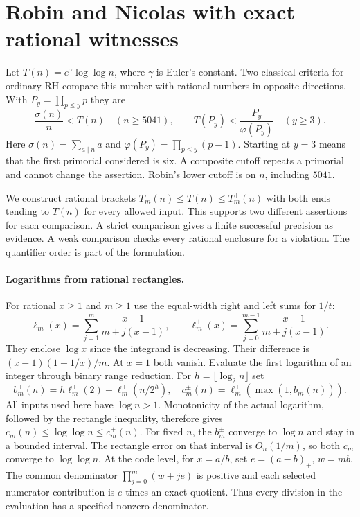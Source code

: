 \section{Robin and Nicolas with exact rational witnesses}\label{sec:named}
Let $T(n)=e^\gamma\log\log n$, where $\gamma$ is Euler's constant. Two classical criteria for ordinary RH compare this number with rational numbers in opposite directions. With $P_y=\prod_{p\le y}p$ they are
\[
 \frac{\sigma(n)}n<T(n)\quad(n\ge5041),\qquad
 T(P_y)<\frac{P_y}{\varphi(P_y)}\quad(y\ge3).
\]
Here $\sigma(n)=\sum_{a\mid n}a$ and $\varphi(P_y)=\prod_{p\le y}(p-1)$. Starting at $y=3$ means that the first primorial considered is six. A composite cutoff repeats a primorial and cannot change the assertion. Robin's lower cutoff is on $n$, including $5041$.

We construct rational brackets $T_m^-(n)\le T(n)\le T_m^+(n)$ with both ends tending to $T(n)$ for every allowed input. This supports two different assertions for each comparison. A strict comparison gives a finite successful precision as evidence. A weak comparison checks every rational enclosure for a violation. The quantifier order is part of the formulation.

\paragraph{Logarithms from rational rectangles.}
For rational $x\ge1$ and $m\ge1$ use the equal-width right and left sums for $1/t$:
\[
 \ell^-_m(x)=\sum_{j=1}^{m}\frac{x-1}{m+j(x-1)},\qquad
 \ell^+_m(x)=\sum_{j=0}^{m-1}\frac{x-1}{m+j(x-1)}.
\]
They enclose $\log x$ since the integrand is decreasing. Their difference is $(x-1)(1-1/x)/m$. At $x=1$ both vanish. Evaluate the first logarithm of an integer through binary range reduction. For $h=\lfloor\log_2 n\rfloor$ set
\[
 b_m^{\pm}(n)=h\ell_m^{\pm}(2)+\ell_m^{\pm}(n/2^h),\quad
 c_m^{\pm}(n)=\ell_m^{\pm}(\max(1,b_m^{\pm}(n))).
\]
All inputs used here have $\log n>1$. Monotonicity of the actual logarithm, followed by the rectangle inequality, therefore gives
$c_m^-(n)\le\log\log n\le c_m^+(n)$. For fixed $n$, the $b_m^{\pm}$ converge to $\log n$ and stay in a bounded interval. The rectangle error on that interval is $O_n(1/m)$, so both $c_m^{\pm}$ converge to $\log\log n$. At the code level, for $x=a/b$, set $e=(a-b)_+$, $w=mb$. The common denominator $\prod_{j=0}^{m}(w+je)$ is positive and each selected numerator contribution is $e$ times an exact quotient. Thus every division in the evaluation has a specified nonzero denominator.

